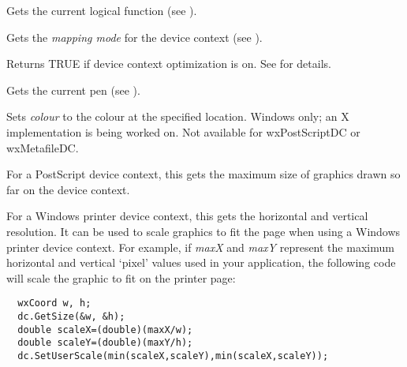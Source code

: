 Gets the current logical function (see ).

\label{wxdcgetmapmode}


Gets the {\it mapping mode} for the device context (see ).

\label{wxdcgetoptimization}


Returns TRUE if device context optimization is on.
See  for details.

\label{wxdcgetpen}


Gets the current pen (see ).

\label{wxdcgetpixel}


Sets {\it colour} to the colour at the specified location. Windows only; an X implementation
is being worked on. Not available for wxPostScriptDC or wxMetafileDC.


\label{wxdcgetsize}


For a PostScript device context, this gets the maximum size of graphics
drawn so far on the device context.

For a Windows printer device context, this gets the horizontal and vertical
resolution. It can be used to scale graphics to fit the page when using
a Windows printer device context. For example, if {\it maxX} and {\it maxY}\rtfsp
represent the maximum horizontal and vertical `pixel' values used in your
application, the following code will scale the graphic to fit on the
printer page:

\begin{verbatim}
  wxCoord w, h;
  dc.GetSize(&w, &h);
  double scaleX=(double)(maxX/w);
  double scaleY=(double)(maxY/h);
  dc.SetUserScale(min(scaleX,scaleY),min(scaleX,scaleY));
\end{verbatim}

